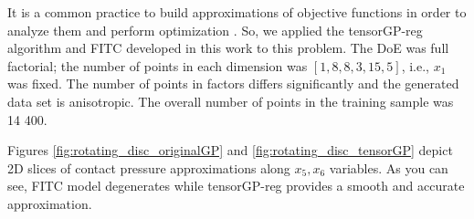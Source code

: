 It is a common practice to build approximations of objective functions in order to analyze them
and perform optimization \citep{forrester2008surrogateModelling}.
So, we applied the tensorGP-reg algorithm and FITC developed in this work to this problem.
The DoE was full factorial; the number of points in each dimension was $[1, 8, 8, 3, 15, 5]$, i.e.,
$x_1$ was fixed.
The number of points in factors differs significantly and the generated data set is anisotropic.
The overall number of points in the training sample was 14 400.

Figures \ref{fig:rotating_disc_originalGP} and \ref{fig:rotating_disc_tensorGP} depict 2D slices of contact pressure
approximations along $x_5, x_6$ variables.
As you can see, FITC model degenerates while tensorGP-reg provides a smooth and accurate approximation.

